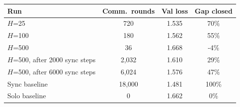 \begin{tabular}{lccc}
\toprule
Run & Comm.\ rounds & Val loss & Gap closed \\
\midrule
$H$=25 & 720 & 1.535 & 70\% \\
$H$=100 & 180 & 1.562 & 55\% \\
$H$=500 & 36 & 1.668 & -4\% \\
$H$=500, after 2000 sync steps & 2{,}032 & 1.610 & 29\% \\
$H$=500, after 6000 sync steps & 6{,}024 & 1.576 & 47\% \\
\midrule
Sync baseline & 18{,}000 & 1.481 & 100\% \\
Solo baseline & 0 & 1.662 & 0\% \\
\bottomrule
\end{tabular}
